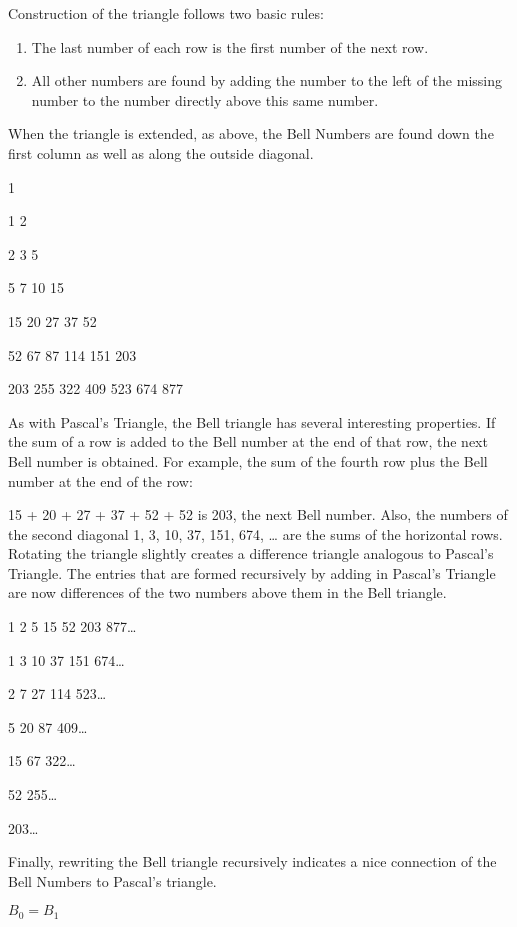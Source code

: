 \documentclass[10pt,letter]{article}
\begin{document}
Construction of the triangle follows two basic rules:

\begin{enumerate}
\def\labelenumi{\arabic{enumi}.}

\item
  The last number of each row is the first number of the next row.
\item
  All other numbers are found by adding the number to the left of the
  missing number to the number directly above this same number.

\end{enumerate}

When the triangle is extended, as above, the Bell Numbers are found down
the first column as well as along the outside diagonal.

1

1 2

2 3 5

5 7 10 15

15 20 27 37 52

52 67 87 114 151 203

203 255 322 409 523 674 877

As with Pascal's Triangle, the Bell triangle has several interesting
properties. If the sum of a row is added to the Bell number at the end
of that row, the next Bell number is obtained. For example, the sum of
the fourth row plus the Bell number at the end of the row:

15 + 20 + 27 + 37 + 52 + 52 is 203, the next Bell number. Also, the
numbers of the second diagonal 1, 3, 10, 37, 151, 674, \ldots{} are the
sums of the horizontal rows. Rotating the triangle slightly creates a
difference triangle analogous to Pascal's Triangle. The entries that are
formed recursively by adding in Pascal's Triangle are now differences of
the two numbers above them in the Bell triangle.

1 2 5 15 52 203 877\ldots{}

1 3 10 37 151 674\ldots{}

2 7 27 114 523\ldots{}

5 20 87 409\ldots{}

15 67 322\ldots{}

52 255\ldots{}

203\ldots{}

Finally, rewriting the Bell triangle recursively indicates a nice
connection of the Bell Numbers to Pascal's triangle.

\(B_{0} = B_{1}\)
\end{document}
